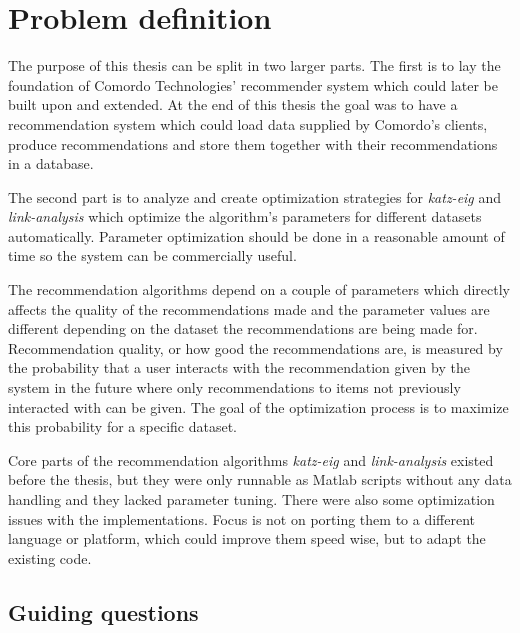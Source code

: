 
\section{Problem definition}\label{sec:intro:problem}

The purpose of this thesis can be split in two larger parts. The first is to lay the foundation of Comordo Technologies' recommender system which could later be built upon and extended. At the end of this thesis the goal was to have a recommendation system which could load data supplied by Comordo's clients, produce recommendations and store them together with their recommendations in a database.

The second part is to analyze and create optimization strategies for \textit{katz-eig} and \textit{link-analysis} which optimize the algorithm's parameters for different datasets automatically. Parameter optimization should be done in a reasonable amount of time so the system can be commercially useful.

The recommendation algorithms depend on a couple of parameters which directly affects the quality of the recommendations made and the parameter values are different depending on the dataset the recommendations are being made for.  Recommendation quality, or how good the recommendations are, is measured by the probability that a user interacts with the recommendation given by the system in the future where only recommendations to items not previously interacted with can be given. The goal of the optimization process is to maximize this probability for a specific dataset.

Core parts of the recommendation algorithms \textit{katz-eig} and \textit{link-analysis} existed before the thesis, but they were only runnable as Matlab scripts without any data handling and they lacked parameter tuning. There were also some optimization issues with the implementations. Focus is not on porting them to a different language or platform, which could improve them speed wise, but to adapt the existing code.

\newpage
\subsection{Guiding questions}\label{sec:intro:questions}

